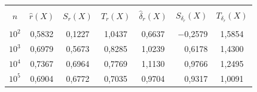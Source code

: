 \begin{table}[b]\small %


\vspace*{-12pt}


\begin{center}




\vspace*{2ex}





\tabcolsep=12pt


\begin{tabular}{|c|c|c|c|c|r|c|}


\hline


&&&&&&\\[-9pt]


$n$  & ${\hat r}(X)$& $S_r(X)$& $T_r(X)$& ${\hat \delta}_r(X)$& 


\multicolumn{1}{c|}{$S_{\delta_r}(X)$}& $T_{\delta_r}(X)$\\[2pt]


\hline


&&&&&&\\[-9pt]


$10^2$& 0{,}5832& 0{,}1227& 1{,}0437& 0{,}6637& $-$0{,}2579& 1{,}5854\\


$10^3$& 0{,}6979& 0{,}5673& 0{,}8285& 1{,}0239& 0{,}6178& 1{,}4300\\


$10^4$& 0{,}7367& 0{,}6964& 0{,}7769& 1{,}1130& 0{,}9766& 1{,}2495\\


$10^5$& 0{,}6904& 0{,}6772& 0{,}7035& 0{,}9704& 0{,}9317& 1{,}0091\\


\hline


\end{tabular}


\end{center}




\vspace*{-8pt}





\end{table}
